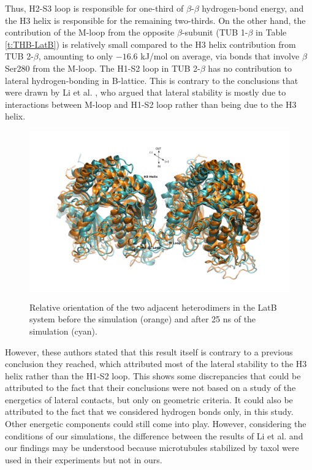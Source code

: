 \documentclass[11pt]{report}
\begin{document}
Thus, H2-S3 loop is responsible for one-third of $\beta$-$\beta$
hydrogen-bond energy, and the H3 helix is responsible for the remaining two-thirds. On the other hand, the contribution of the M-loop from the opposite $\beta$-subunit (TUB 1-$\beta$ in Table
\ref{t:THB-LatB}) is relatively small compared to the H3 helix contribution from TUB 2-$\beta$, amounting to only $-16.6$ kJ/mol on average, via bonds that involve $\beta$Ser280 from the M-loop. 
The H1-S2 loop in TUB 2-$\beta$ has no contribution to lateral hydrogen-bonding in B-lattice. This is contrary to the conclusions that were drawn by Li et al.
\cite{Li2002}, 
who argued that lateral stability is mostly due to interactions between M-loop and H1-S2 loop rather than being due to the H3 helix.
\begin{figure}
  \centering
  \caption[Relative orientation of the two adjacent heterodimers]{Relative orientation of the two adjacent heterodimers in the LatB
  system before the simulation (orange) and after 25 ns of the simulation (cyan).}
  \includegraphics[trim= 2.3cm 0.8cm 2.3cm 1.3cm, clip=true, width=0.9\linewidth]{images/H3-rot}
  \label{f:THB-H3-rot}
\end{figure}
 However, these authors stated that this result itself is contrary to a previous conclusion they reached, which attributed most of the lateral stability to the H3 helix rather than the H1-S2 loop. This shows some discrepancies that could be attributed to the fact that their conclusions were not based on a study of the energetics of lateral contacts, but only on geometric criteria. It could also be attributed to the fact that we considered hydrogen bonds only, in this study. Other energetic components could still come into play.
However, considering the conditions of our simulations,
the difference between the results of Li et al.
\cite{Li2002} 
and our findings may be understood because microtubules stabilized by taxol were used in their experiments but not in ours.
\end{document}
